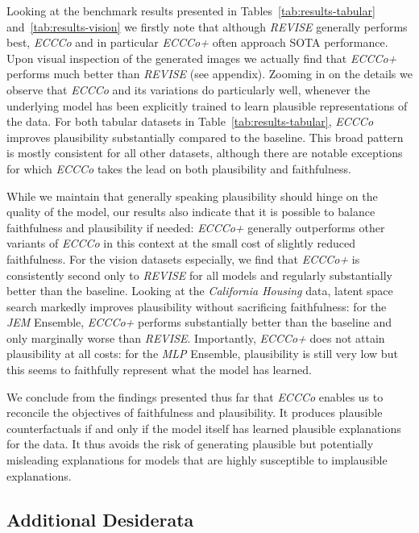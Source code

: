 \documentclass[letterpaper]{article} %
\begin{document}
Looking at the benchmark results presented in Tables~\ref{tab:results-tabular} and~\ref{tab:results-vision} we firstly note that although \textit{REVISE} generally performs best, \textit{ECCCo} and in particular \textit{ECCCo+} often approach SOTA performance. Upon visual inspection of the generated images we actually find that \textit{ECCCo+} performs much better than \textit{REVISE} (see appendix). Zooming in on the details we observe that \textit{ECCCo} and its variations do particularly well, whenever the underlying model has been explicitly trained to learn plausible representations of the data. For both tabular datasets in Table~\ref{tab:results-tabular}, \textit{ECCCo} improves plausibility substantially compared to the baseline. This broad pattern is mostly consistent for all other datasets, although there are notable exceptions for which \textit{ECCCo} takes the lead on both plausibility and faithfulness. 

While we maintain that generally speaking plausibility should hinge on the quality of the model, our results also indicate that it is possible to balance faithfulness and plausibility if needed: \textit{ECCCo+} generally outperforms other variants of \textit{ECCCo} in this context at the small cost of slightly reduced faithfulness. For the vision datasets especially, we find that  \textit{ECCCo+} is consistently second only to \textit{REVISE} for all models and regularly substantially better than the baseline. Looking at the \textit{California Housing} data, latent space search markedly improves plausibility without sacrificing faithfulness: for the \textit{JEM} Ensemble, \textit{ECCCo+} performs substantially better than the baseline and only marginally worse than \textit{REVISE}. Importantly, \textit{ECCCo+} does not attain plausibility at all costs: for the \textit{MLP} Ensemble, plausibility is still very low but this seems to faithfully represent what the model has learned. 

We conclude from the findings presented thus far that \textit{ECCCo} enables us to reconcile the objectives of faithfulness and plausibility. It produces plausible counterfactuals if and only if the model itself has learned plausible explanations for the data. It thus avoids the risk of generating plausible but potentially misleading explanations for models that are highly susceptible to implausible explanations.

\subsection{Additional Desiderata}
\end{document}
